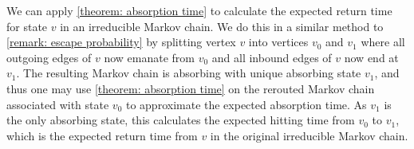 \begin{remark}\label{remark: expected return time irreducible}
We can apply \cref{theorem: absorption time} to calculate 
the expected return time for state $v$ in an irreducible Markov chain.
We do this in a similar method to \cref{remark: escape probability} 
by splitting vertex $v$ into vertices $v_0$ and $v_1$ 
where all outgoing edges of $v$ now emanate from $v_0$ 
and all inbound edges of $v$ now end at $v_1$.
The resulting Markov chain is absorbing with unique absorbing state $v_1$, 
and thus one may use \cref{theorem: absorption time} 
on the rerouted Markov chain associated with state $v_0$ 
to approximate the expected absorption time.
As $v_1$ is the only absorbing state, this calculates 
the expected hitting time from $v_0$ to $v_1$, 
which is the expected return time from $v$ 
in the original irreducible Markov chain.
\end{remark}
